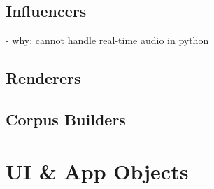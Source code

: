 
\subsection{Influencers}\label{ssec:3-influencers}
- why: cannot handle real-time audio in python


\subsection{Renderers}\label{ssec:3-renderers}


\subsection{Corpus Builders}\label{ssec:3-corpusbuilders}


\section{UI \& App Objects}\label{ssec:3-app-objects}
